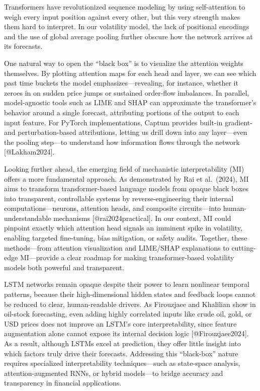 \documentclass[
  letterpaper,
  DIV=11,
  numbers=noendperiod]{scrartcl}
\begin{document}
Transformers have revolutionized sequence modeling by using
self-attention to weigh every input position against every other, but
this very strength makes them hard to interpret. In our volatility
model, the lack of positional encodings and the use of global average
pooling further obscure how the network arrives at its forecasts.

One natural way to open the ``black box'' is to visualize the attention
weights themselves. By plotting attention maps for each head and layer,
we can see which past time buckets the model emphasizes---revealing, for
instance, whether it zeroes in on sudden price jumps or sustained
order-flow imbalances. In parallel, model-agnostic tools such as LIME
and SHAP can approximate the transformer's behavior around a single
forecast, attributing portions of the output to each input feature. For
PyTorch implementations, Captum provides built-in gradient- and
perturbation-based attributions, letting us drill down into any
layer---even the pooling step---to understand how information flows
through the network {[}@Lakham2024{]}.

Looking further ahead, the emerging field of mechanistic
interpretability (MI) offers a more fundamental approach. As
demonstrated by Rai et al.~(2024), MI aims to transform
transformer-based language models from opaque black boxes into
transparent, controllable systems by reverse-engineering their internal
computations---neurons, attention heads, and composite circuits---into
human-understandable mechanisms {[}@rai2024practical{]}. In our context,
MI could pinpoint exactly which attention head signals an imminent spike
in volatility, enabling targeted fine-tuning, bias mitigation, or safety
audits. Together, these methods---from attention visualization and
LIME/SHAP explanations to cutting-edge MI---provide a clear roadmap for
making transformer-based volatility models both powerful and
transparent.

LSTM networks remain opaque despite their power to learn nonlinear
temporal patterns, because their high-dimensional hidden states and
feedback loops cannot be reduced to clear, human-readable drivers. As
Firouzjaee and Khalilian show in oil-stock forecasting, even adding
highly correlated inputs like crude oil, gold, or USD prices does not
improve an LSTM's core interpretability, since feature augmentation
alone cannot expose its internal decision logic {[}@Firouzjaee2024{]}.
As a result, although LSTMs excel at prediction, they offer little
insight into which factors truly drive their forecasts. Addressing this
``black-box'' nature requires specialized interpretability
techniques---such as state-space analysis, attention-augmented RNNs, or
hybrid models---to bridge accuracy and transparency in financial
applications.
\end{document}

